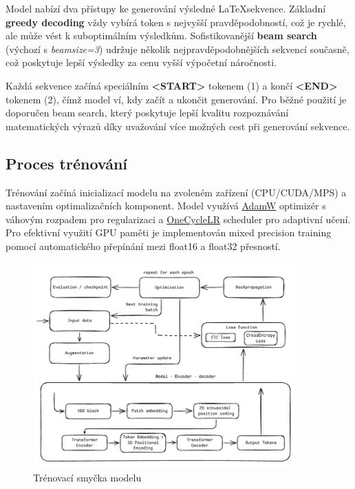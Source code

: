 Model nabízí dva přístupy ke generování výsledné \LaTeX sekvence. Základní \textbf{greedy decoding} vždy vybírá token s nejvyšší pravděpodobností, což je rychlé, ale může vést k suboptimálním výsledkům. Sofistikovanější \textbf{beam search} (výchozí s \textit{beam\textunderscore size=3}) udržuje několik nejpravděpodobnějších sekvencí současně, což poskytuje lepší výsledky za cenu vyšší výpočetní náročnosti.

Každá sekvence začíná speciálním \textbf{<START>} tokenem (1) a končí \textbf{<END>} tokenem (2), čímž model ví, kdy začít a ukončit generování. Pro běžné použití je doporučen beam search, který poskytuje lepší kvalitu rozpoznávání matematických výrazů díky uvažování více možných cest při generování sekvence.

\subsection{Proces trénování}

Trénování začíná inicializací modelu na zvoleném zařízení (CPU/CUDA/MPS) a nastavením optimalizačních komponent. Model využívá \href{https://docs.pytorch.org/docs/stable/generated/torch.optim.AdamW.html}{AdamW} optimizér s váhovým rozpadem pro regularizaci a \href{https://docs.pytorch.org/docs/stable/generated/torch.optim.lr_scheduler.OneCycleLR.html}{OneCycleLR} scheduler pro adaptivní učení. Pro efektivní využití GPU paměti je implementován mixed precision training pomocí automatického přepínání mezi float16 a float32 přesností.

\begin{figure}[h!]
    \centering
    \includegraphics[width=0.9\textwidth]{img/training.png}
    \caption{Trénovací smyčka modelu}
    \label{img:seq_sol}
\end{figure}

